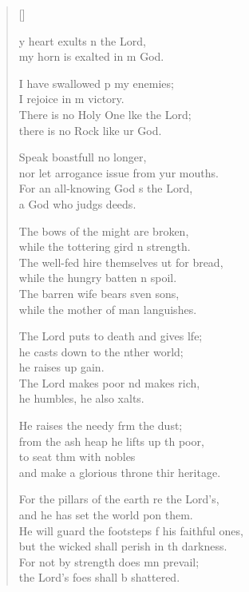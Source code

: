 \settowidth{\versewidth}{He will guard the footsteps of his faithful ones, *}
\begin{verse}[\versewidth]
  \begin{patverse}
    y heart exults \pointup{\i}n the Lord,\Med\\
my horn is exalted in m God.

I have swallowed p my enemies;\Med\\
I rejoice in m victory.\\
There is no Holy One l\pointup{\i}ke the Lord;\Med\\
there is no Rock like ur God.

Speak boastfull no longer,\Med\\
nor let arrogance issue from yur mouths.\\
For an all-knowing God \pointup{\i}s the Lord,\Med\\
a God who judgs deeds.

The bows of the might are broken,\Med\\
while the tottering gird n strength.\\
The well-fed hire themselves ut for bread,\Med\\
while the hungry batten n spoil.\\
The barren wife bears sven sons,\Med\\
while the mother of man languishes.

The Lord puts to death and gives l\pointup{\i}fe;\Flex\\
he casts down to the nther world;\Med\\
he raises up gain.\\
The Lord makes poor nd makes rich,\Med\\
he humbles, he also xalts.

He raises the needy frm the dust;\Med\\
from the ash heap he lifts up th poor,\\
to seat thm with nobles\Med\\
and make a glorious throne thir heritage.

For the pillars of the earth re the Lord’s,\Med\\
and he has set the world pon them.\\
He will guard the footsteps f his faithful ones,\Med\\
but the wicked shall perish in th darkness.\\
For not by strength does mn prevail;\Med\\
the Lord’s foes shall b shattered.


\end{patverse}
\end{verse}
